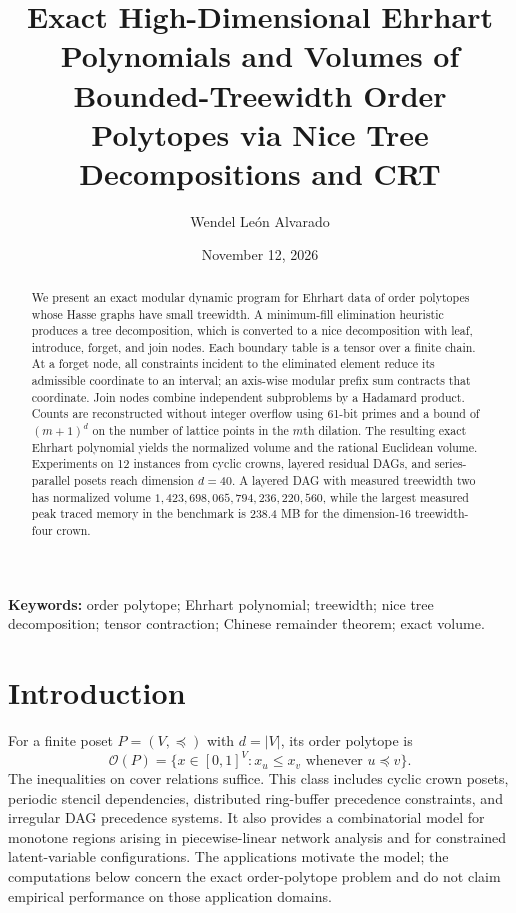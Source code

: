 \documentclass[10pt]{article}
\title{\textbf{Exact High-Dimensional Ehrhart Polynomials and Volumes of Bounded-Treewidth Order Polytopes via Nice Tree Decompositions and CRT}}
\author{Wendel León Alvarado}
\date{November 12, 2026}
\begin{document}
\maketitle

\begin{abstract}
We present an exact modular dynamic program for Ehrhart data of order polytopes whose Hasse graphs have small treewidth. A minimum-fill elimination heuristic produces a tree decomposition, which is converted to a nice decomposition with leaf, introduce, forget, and join nodes. Each boundary table is a tensor over a finite chain. At a forget node, all constraints incident to the eliminated element reduce its admissible coordinate to an interval; an axis-wise modular prefix sum contracts that coordinate. Join nodes combine independent subproblems by a Hadamard product. Counts are reconstructed without integer overflow using 61-bit primes and a bound of $(m+1)^d$ on the number of lattice points in the $m$th dilation. The resulting exact Ehrhart polynomial yields the normalized volume and the rational Euclidean volume. Experiments on 12 instances from cyclic crowns, layered residual DAGs, and series-parallel posets reach dimension $d=40$. A layered DAG with measured treewidth two has normalized volume $1{,}423{,}698{,}065{,}794{,}236{,}220{,}560$, while the largest measured peak traced memory in the benchmark is 238.4 MB for the dimension-16 treewidth-four crown.
\end{abstract}

\noindent\textbf{Keywords:} order polytope; Ehrhart polynomial; treewidth; nice tree decomposition; tensor contraction; Chinese remainder theorem; exact volume.

\section{Introduction}

For a finite poset $P=(V,\preceq)$ with $d=|V|$, its order polytope is
\[
\mathcal{O}(P)=\{x\in[0,1]^V:x_u\leq x_v\text{ whenever }u\preceq v\}.
\]
The inequalities on cover relations suffice. This class includes cyclic crown posets, periodic stencil dependencies, distributed ring-buffer precedence constraints, and irregular DAG precedence systems. It also provides a combinatorial model for monotone regions arising in piecewise-linear network analysis and for constrained latent-variable configurations. The applications motivate the model; the computations below concern the exact order-polytope problem and do not claim empirical performance on those application domains.
\end{document}
